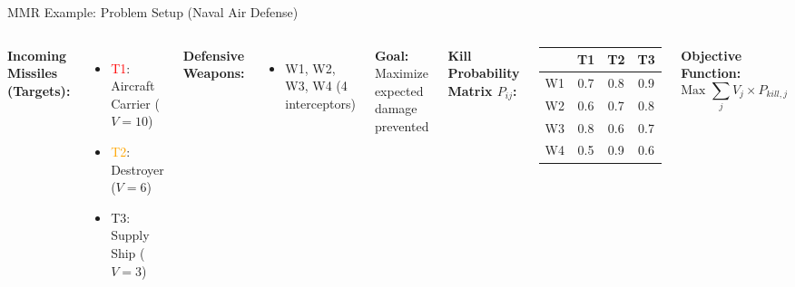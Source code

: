 \documentclass[aspectratio=43,8pt]{beamer}
\begin{document}
\begin{frame}{MMR Example: Problem Setup (Naval Air Defense)}
\begin{columns}
\textbf{Incoming Missiles (Targets):}
\begin{itemize}
    \item \textcolor{red}{T1}: Aircraft Carrier ($V=10$)
    \item \textcolor{orange}{T2}: Destroyer ($V=6$)
    \item \textcolor{yellow!80!black}{T3}: Supply Ship ($V=3$)
\end{itemize}

\vspace{0.3cm}
\textbf{Defensive Weapons:}
\begin{itemize}
    \item W1, W2, W3, W4 (4 interceptors)
\end{itemize}

\vspace{0.3cm}
\textbf{Goal:} Maximize expected damage prevented

\textbf{Kill Probability Matrix $P_{ij}$:}
\begin{table}[h]
\centering
\small
\begin{tabular}{c|ccc}
     & T1 & T2 & T3 \\ \hline
W1 & 0.7 & 0.8 & 0.9 \\
W2 & 0.6 & 0.7 & 0.8 \\
W3 & 0.8 & 0.6 & 0.7 \\
W4 & 0.5 & 0.9 & 0.6 \\
\end{tabular}
\end{table}

\vspace{0.3cm}
\textbf{Objective Function:}
$$\text{Max } \sum_{j} V_j \times P_{kill,j}$$
\end{columns}
\end{frame}
\end{document}

